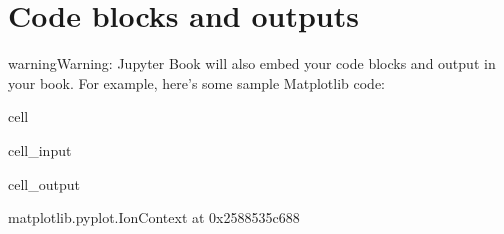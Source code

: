\documentclass[letterpaper,10pt,english]{jupyterBook}
\begin{document}
\section{Code blocks and outputs}
\label{\detokenize{00_Intro/notebooks:code-blocks-and-outputs}}
\begin{sphinxadmonition}{warning}{Warning:}
\sphinxAtStartPar
Jupyter Book will also embed your code blocks and output in your book.
For example, here’s some sample Matplotlib code:
\end{sphinxadmonition}

\begin{sphinxuseclass}{cell}\begin{sphinxVerbatimInput}

\begin{sphinxuseclass}{cell_input}
\begin{sphinxVerbatim}[commandchars=\\\{\}]
    
   
   
\end{sphinxVerbatim}

\end{sphinxuseclass}\end{sphinxVerbatimInput}
\begin{sphinxVerbatimOutput}

\begin{sphinxuseclass}{cell_output}
\begin{sphinxVerbatim}[commandchars=\\\{\}]
\PYGZlt{}matplotlib.pyplot.\PYGZus{}IonContext at 0x2588535c688\PYGZgt{}
\end{sphinxVerbatim}

\end{sphinxuseclass}\end{sphinxVerbatimOutput}

\end{sphinxuseclass}
\end{document}
